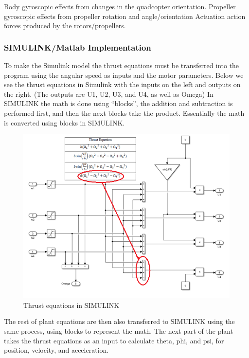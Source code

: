 Body gyroscopic effects from changes in the quadcopter orientation.
Propeller gyroscopic effects from propeller rotation and angle/orientation
Actuation action forces produced by the rotors/propellers.

\subsubsection{SIMULINK/Matlab Implementation}
To make the Simulink model the thrust equations must be transferred into the program using the angular speed as inputs and the motor parameters. Below we see the thrust equations in Simulink with the inputs on the left and outputs on the right. (The outputs are U1, U2, U3, and U4, as well as Omega) In SIMULINK the math is done using “blocks”, the addition and subtraction is performed first, and then the next blocks take the product. Essentially the math is converted using blocks in SIMULINK.

\begin{figure}[H]
\begin{center}
   \includegraphics[scale =1]{pictures/control/thrust equation in simulink.png}
\end{center}
\caption{Thrust equations in SIMULINK}
\end{figure}

The rest of plant equations are then also transferred to SIMULINK using the same process, using blocks to represent the math. The next part of the plant takes the thrust equations as an input to calculate theta, phi, and psi, for position, velocity, and acceleration.

